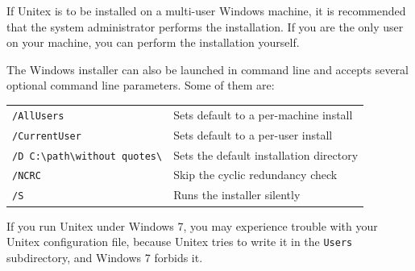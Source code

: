 \bigskip
\noindent If Unitex is to be installed on a multi-user Windows machine, it is recommended
that the system administrator performs the installation. If you are the only
user on your machine, you can perform the installation yourself.

\bigskip
\begin{samepage}
\noindent The Windows installer can also be launched in command line and accepts several optional
command line parameters. Some of them are:

\begin{table}[!htbp]
\centering
\begin{tabular}{ll}
\texttt{/AllUsers}    & Sets default to a per-machine install \\
\texttt{/CurrentUser} & Sets default to a per-user install\\
\texttt{/D C:\textbackslash{}path\textbackslash{}without quotes\textbackslash{}} & Sets the default installation directory \\
\texttt{/NCRC}        & Skip the cyclic redundancy check\\
\texttt{/S}           & Runs the installer silently
\end{tabular}
\end{table}

\end{samepage}

\noindent If you run Unitex under Windows 7, you may experience trouble with your Unitex configuration
file, because Unitex tries to write it in the \verb+Users+ subdirectory, and Windows 7 forbids it.

